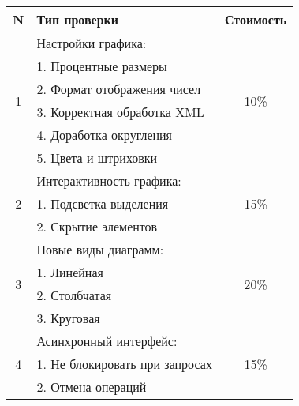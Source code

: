 \documentclass[10pt,a4paper]{article}
\begin{document}
\begin{table}
\begin{center}
\noindent\begin{tabularx}{\linewidth}{|c|X|c|}

		\hline

		\textbf{N} & \textbf{Тип проверки} & \textbf{Стоимость} \\

		\hline

		\multirow{6}{*}{1} & Настройки графика: & \multirow{6}{*}{10\%} \\

		   & 1. Процентные размеры & \\

		   & 2. Формат отображения чисел & \\

		   & 3. Корректная обработка XML & \\

		   & 4. Доработка округления & \\

		   & 5. Цвета и штриховки & \\

		\hline

		\multirow{3}{*}{2} & Интерактивность графика: & \multirow{3}{*}{15\%} \\

		   & 1. Подсветка выделения & \\

		   & 2. Скрытие элементов & \\

		\hline

		\multirow{4}{*}{3} & Новые виды диаграмм: & \multirow{4}{*}{20\%} \\

		   & 1. Линейная & \\

		   & 2. Столбчатая & \\

		   & 3. Круговая & \\

		\hline

		\multirow{3}{*}{4} & Асинхронный интерфейс: & \multirow{3}{*}{15\%} \\

		   & 1. Не блокировать при запросах & \\

		   & 2. Отмена операций & \\


\end{tabularx}
\end{center}
\end{table}
\end{document}
